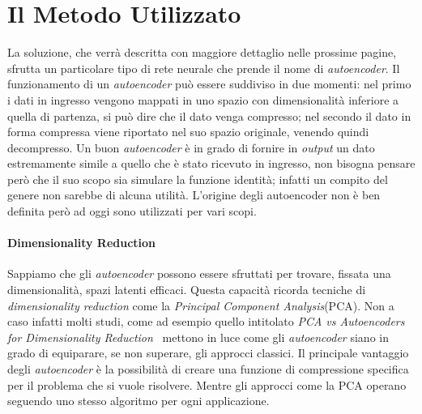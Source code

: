 %
%
%
%

\section{Il Metodo Utilizzato}
La soluzione, che verrà descritta con maggiore dettaglio nelle prossime pagine, sfrutta un particolare tipo di rete neurale che prende il nome di \textit{autoencoder}.
Il funzionamento di un \textit{autoencoder} può essere suddiviso in due momenti:
nel primo i dati in ingresso vengono mappati in uno spazio con dimensionalità inferiore a quella di partenza, si può dire che il dato venga compresso;
nel secondo il dato in forma compressa viene riportato nel suo spazio originale, venendo quindi decompresso.
Un buon \textit{autoencoder} è in grado di fornire in \textit{output} un dato estremamente simile a quello che è stato ricevuto in ingresso, non bisogna pensare però che il suo scopo sia simulare la funzione identità; infatti un compito del genere non sarebbe di alcuna utilità.
L'origine degli autoencoder non è ben definita però ad oggi sono utilizzati per vari scopi.

\paragraph{Dimensionality Reduction}
Sappiamo che gli \textit{autoencoder} possono essere sfruttati per trovare, fissata una dimensionalità, spazi latenti efficaci.
Questa capacità ricorda tecniche di \textit{dimensionality reduction} come la \textit{Principal Component Analysis}(PCA).
Non a caso infatti molti studi, come ad esempio quello intitolato \textit{PCA vs Autoencoders for Dimensionality Reduction}~\cite{pca_vs_ae_1} mettono in luce come gli \textit{autoencoder} siano in grado di equiparare, se non superare, gli approcci classici.
Il principale vantaggio degli \textit{autoencoder} è la possibilità di creare una funzione di compressione specifica per il problema che si vuole risolvere.
Mentre gli approcci come la PCA operano seguendo uno stesso algoritmo per ogni applicazione.

